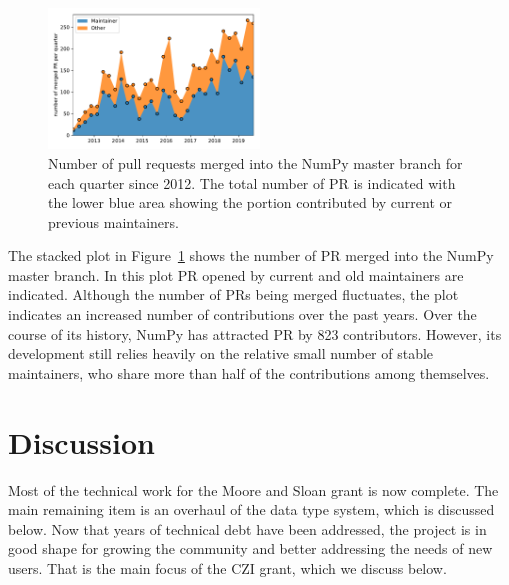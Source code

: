 \documentclass[fleqn,10pt]{wlscirep}
\begin{document}
\begin{figure}
    \centering
    \includegraphics[width=0.5\textwidth]{scripts/PRs-using-CURRENT_MAINTAINERS.pdf}
    \caption{Number of pull requests merged into the NumPy master branch for each
        quarter since 2012. The total number of PR is indicated with the
        lower blue area showing the portion contributed by current or previous
        maintainers.}\label{fig:prs-over-time}
\end{figure}

The stacked plot in Figure~\ref{fig:prs-over-time} shows the number of
PR merged into the NumPy master branch.
In this plot PR opened by current and old maintainers are indicated.
Although the number of PRs being merged fluctuates,
the plot indicates an increased number of contributions over the past
years.
Over the course of its history, NumPy has attracted PR by 823 contributors.
However, its development still relies heavily on the relative small number
of stable maintainers, who share more than half of the contributions among
themselves.





\section*{Discussion}

Most of the technical work for the Moore and Sloan grant is now complete.
The main remaining item is an overhaul of the data type system, which is discussed
below.  Now that years of technical debt have been addressed, the project
is in good shape for growing the community and better addressing the needs
of new users.  That is the main focus of the CZI grant, which we discuss
below.
\end{document}
